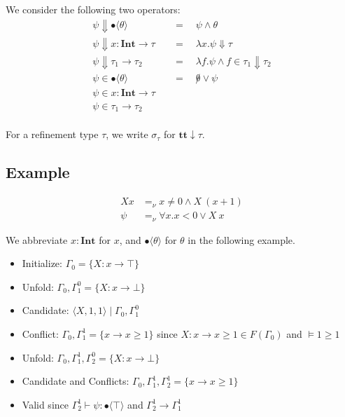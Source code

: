\documentclass[runningheads]{llncs}
\newcommand \true {\textbf{tt}}
\newcommand \stypeint {\textbf{Int}}
\newcommand \stypebool {\bullet}
\newcommand \constraint {\theta}
\newcommand \typeint[1]{{#1} : \stypeint}
\newcommand \typebool[1]{\stypebool \langle #1 \rangle}
\begin{document}
We consider the following two operators:
\begin{align*}
    \psi \Downarrow \typebool{\constraint} \quad
        &= \quad \psi \land \constraint
        \\
    \psi \Downarrow \typeint{x} \to \tau   \quad
        &= \quad \lambda x. \psi \Downarrow \tau
        \\
    \psi \Downarrow \tau_1 \to \tau_2 \quad
        &= \quad \lambda f. \psi \land f \in \tau_1 \Downarrow \tau_2
        \\
    \psi \in \typebool{\constraint} \quad
        &= \quad \not \theta \lor \psi
        \\
    \psi \in \typeint{x} \to \tau   \quad
        &
        \\
    \psi \in \tau_1 \to \tau_2 \quad
        &
        \\
\end{align*}

For a refinement type \( \tau \),
we write \( \sigma_\tau \) for \( \true \downarrow \tau \).

\subsection{Example}

\begin{align*}
    X x &=_\nu x \neq 0 \land X\ (x + 1) \\
    \psi  &=_\nu \forall x. x < 0 \lor X\ x
\end{align*}

We abbreviate \(\typeint{x}\) for \(x\), and \(\typebool{\theta}\) for
\(\theta\) in the following example.

\begin{itemize}
    \item Initialize: \(\Gamma_0 = \{X: x \rightarrow \top\}\)
    \item Unfold: \(\Gamma_0, \Gamma_1^0 = \{X: x \rightarrow \bot\}\)
    \item Candidate: \(\langle X, 1, 1 \rangle \mid \Gamma_0, \Gamma_1^0\)
    \item Conflict: \(\Gamma_0, \Gamma_1^1 = \{x \rightarrow x \geq 1\}\)
        since \(X: x \rightarrow x \geq 1 \in F(\Gamma_0)\) and \(\models 1 \geq 1\)
    \item Unfold: \(\Gamma_0, \Gamma_1^1, \Gamma_2^0 = \{X: x \rightarrow \bot\}\)
    \item Candidate and Conflicts: \(\Gamma_0, \Gamma_1^1, \Gamma_2^1 = \{x \rightarrow x \geq 1\}\)
    \item Valid since \(\Gamma_2^1 \vdash \psi: \typebool{\top} \)
        and \(\Gamma_2^1 \rightarrow \Gamma_1^1\)
\end{itemize}
\end{document}
